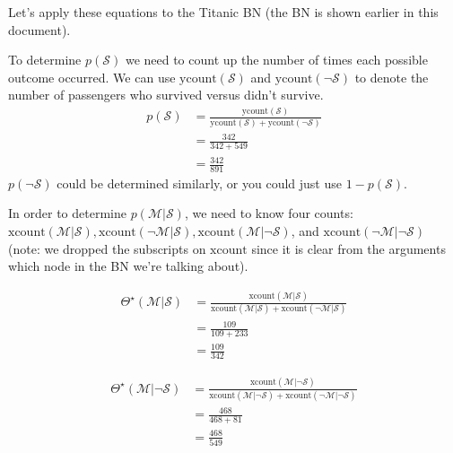 \documentclass{tufte-handout}
\begin{document}
Let's apply these equations to the Titanic BN (the BN is shown earlier in this document).

\bi
\item To determine $p(\mathcal{S})$ we need to count up the number of times each possible outcome occurred.  We can use $\mbox{ycount}(\mathcal{S})$ and  $\mbox{ycount}(\neg \mathcal{S})$ to denote the number of passengers who survived versus didn't survive.
\begin{align}
p(\mathcal{S}) &= \frac{\mbox{ycount}(\mathcal{S})}{\mbox{ycount}(\mathcal{S}) + \mbox{ycount}(\neg \mathcal{S})} \nonumber \\
&= \frac{342}{342+549} \nonumber \\
&= \frac{342}{891} \nonumber
\end{align}
$p(\neg \mathcal{S})$ could be determined similarly, or you could just use $1-p(\mathcal{S})$.

\item In order to determine $p(\mathcal{M} | \mathcal{S})$, we need to know four counts: $\mbox{xcount}(\mathcal{M}| \mathcal{S}), \mbox{xcount}(\neg \mathcal{M}| \mathcal{S}), \mbox{xcount}(\mathcal{M}|\neg \mathcal{S})$, and $\mbox{xcount}(\neg \mathcal{M}|\neg \mathcal{S})$ (note: we dropped the subscripts on $\mbox{xcount}$ since it is clear from the arguments which node in the BN we're talking about).

\begin{align}
\Theta^\star(\mathcal{M}|  \mathcal{S}) &= \frac{\mbox{xcount}(\mathcal{M}| \mathcal{S})}{\mbox{xcount}(\mathcal{M}| \mathcal{S}) + \mbox{xcount}(\neg \mathcal{M}|  \mathcal{S}) } \nonumber \\
&= \frac{109}{109+233} \nonumber \\
&= \frac{109}{342} \nonumber
\end{align}

\begin{align}
\Theta^\star(\mathcal{M}| \neg \mathcal{S}) &= \frac{\mbox{xcount}(\mathcal{M}| \neg \mathcal{S})}{\mbox{xcount}(\mathcal{M}| \neg \mathcal{S}) + \mbox{xcount}(\neg \mathcal{M}| \neg \mathcal{S}) } \nonumber \\
&= \frac{468}{468+81} \nonumber \\
&= \frac{468}{549} \nonumber
\end{align}
\end{document}
